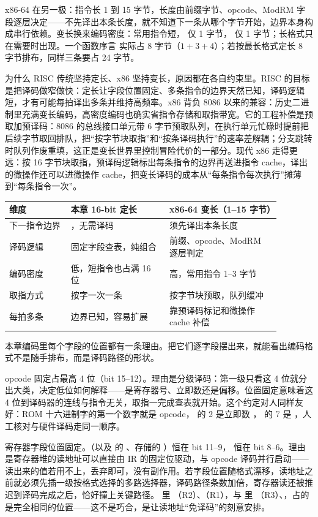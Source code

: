 x86-64 在另一极：指令长 1 到 15 字节，长度由前缀字节、opcode、ModRM 字段逐层决定——不先译出本条长度，就不知道下一条从哪个字节开始，边界本身构成串行依赖。变长换来编码密度：常用指令短， 仅 1 字节， 仅 1 字节；长格式只在需要时出现。一个函数序言  实际占 8 字节（$1+3+4$）；若按最长格式定长 8 字节排布，同样三条要占 24 字节。

为什么 RISC 传统坚持定长、x86 坚持变长，原因都在各自约束里。RISC 的目标是把译码做窄做快：定长让字段位置固定、多条指令的边界天然已知，译码逻辑短，才有可能每拍译出多条并维持高频率。x86 背负 8086 以来的兼容：历史二进制里充满变长编码，高密度编码也确实省指令存储和取指带宽。它的工程补偿是预取加预译码：8086 的总线接口单元带 6 字节预取队列，在执行单元忙碌时提前把后续字节取回排队，把“按字节块取指”和“按条译码执行”的速率差解耦；分支跳转时队列作废重填，这正是变长世界里控制冒险代价的一部分。现代 x86 走得更远：按 16 字节块取指，预译码逻辑标出每条指令的边界再送进指令 cache，译出的微操作还可以进微操作 cache，把变长译码的成本从“每条指令每次执行”摊薄到“每条指令一次”。

\begin{longtable}{L{0.2\linewidth}L{0.32\linewidth}L{0.36\linewidth}}
\toprule
维度 & 本章 16-bit 定长 & x86-64 变长（1–15 字节） \\
\midrule
下一指令边界 & ，无需译码 & 须先译出本条长度 \\
译码逻辑 & 固定字段查表，纯组合 & 前缀、opcode、ModRM 逐层判定 \\
编码密度 & 低，短指令也占满 16 位 & 高，常用指令 1–3 字节 \\
取指方式 & 按字一次一条 & 按字节块预取，队列缓冲 \\
每拍多条 & 边界已知，容易扩展 & 靠预译码标记和微操作 cache 补偿 \\
\bottomrule
\end{longtable}

本章编码里每个字段的位置都有一条理由。把它们逐字段摆出来，就能看出编码格式不是随手排布，而是译码路径的形状。

opcode 固定占最高 4 位（bit 15–12）。理由是分级译码：第一级只看这 4 位就分出大类，决定低位如何解释——是寄存器号、立即数还是偏移。位置固定意味着这 4 位到译码器的连线与指令无关，取指一完成查表就开始。这个约定对人同样友好：ROM 十六进制字的第一个数字就是 opcode， 的 2 是立即数 ， 的 7 是 ，人工核对与硬件译码走同一顺序。

寄存器字段位置固定。（以及  的 、存储的 ）恒在 bit 11–9， 恒在 bit 8–6。理由是寄存器堆的读地址可以直接由 IR 的固定位驱动，与 opcode 译码并行启动——读出来的值若用不上，丢弃即可，没有副作用。若字段位置随格式漂移，读地址之前就必须先插一级按格式选择的多路选择器，译码路径条数加倍，寄存器读还被推迟到译码完成之后，恰好撞上关键路径。 里 （R2）、（R1），与  里 （R3）、，占的是完全相同的位置——这不是巧合，是让读地址“免译码”的刻意安排。

